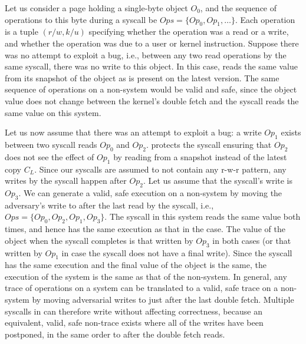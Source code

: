\documentclass[letterpaper,twocolumn,10pt, anonymous]{article}
\begin{document}

Let us consider a page holding a single-byte object $O_0$, and the 
sequence of operations to this byte during a \tiktok syscall be 
$Ops = \{Op_0, Op_1, \dots \}$. 
Each operation is a tuple $(r/w, k/u)$ specifying whether the 
operation was a read or a write, and whether the operation was due to 
a user or kernel instruction.
Suppose there was no attempt to exploit a \tocttou bug, i.e., between
any two read operations by the same syscall, there was no write to 
this object.
In this case, \tiktok reads the same value from its snapshot of the 
object as is present on the latest version. 
The same sequence of operations on a non-\tiktok system would be valid and
safe, since the object value does not change between the kernel's double 
fetch and the syscall reads the same value on this system.

Let us now
%
assume that there was an attempt to exploit a \tocttou bug:
a write $Op_1$ exists between two syscall reads $Op_0$ and $Op_2$.
\tiktok protects the syscall ensuring that $Op_2$ does not see the 
effect of $Op_1$ by reading from a snapshot instead of the latest 
copy $C_L$. 
Since our syscalls are assumed to not contain any r-w-r pattern, 
any writes by the syscall happen after $Op_2$.
Let us assume that the syscall's write is $Op_3$.
We can generate a valid, safe execution on a non-\tiktok system 
by moving the adversary's write to after the last read by the 
syscall, i.e., $Ops = \{Op_0, Op_2, Op_1, Op_3\}$.
The syscall in this system reads the same value both times, and 
hence has the same execution as that in the \tiktok case.
The value of the object when the syscall completes is that 
written by $Op_3$ in both cases (or that written by $Op_1$ in 
case the syscall does not have a final write).
Since the syscall has the same execution and the final value of 
the object is the same, the execution of the \tiktok system 
is the same as that of the non-\tiktok system.
In general, any trace of operations on a \tiktok system can 
be translated  to a valid, safe trace on a non-\tiktok system 
by moving adversarial writes to just after the last
double fetch.
Multiple syscalls in \tiktok can therefore write without affecting 
correctness, because an equivalent, valid, safe non-\tiktok trace 
exists where all of the writes have been postponed, in the same order 
to after the double fetch reads. 
\end{document}

